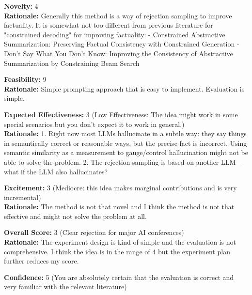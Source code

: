 \begin{tcolorbox}[colback=green!10!white, colframe=green!80!black, title=\textbf{Reviewer 2}]
\small
\textbf{Novelty:} 4\\
\textbf{Rationale:} Generally this method is a way of rejection sampling to improve factuality. It is somewhat not too different from previous literature for "constrained decoding" for improving factuality: 
- Constrained Abstractive Summarization: Preserving Factual Consistency with Constrained Generation
- Don’t Say What You Don’t Know: Improving the Consistency of Abstractive Summarization by Constraining Beam Search

\vspace{10pt}

\textbf{Feasibility:} 9\\
\textbf{Rationale:} Simple prompting approach that is easy to implement. Evaluation is simple.

\vspace{10pt}

\textbf{Expected Effectiveness:} 3 (Low Effectiveness: The idea might work in some special scenarios but you don't expect it to work in general.)\\
\textbf{Rationale:} 1. Right now most LLMs hallucinate in a subtle way: they say things in semantically correct or reasonable ways, but the precise fact is incorrect. Using semantic similarity as a measurement to gauge/control hallucination might not be able to solve the problem. 
2. The rejection sampling is based on another LLM—what if the LLM also hallucinates?

\vspace{10pt}

\textbf{Excitement:} 3 (Mediocre: this idea makes marginal contributions and is very incremental)\\
\textbf{Rationale:} The method is not that novel and I think the method is not that effective and might not solve the problem at all.

\vspace{10pt}

\textbf{Overall Score:} 3 (Clear rejection for major AI conferences)\\
\textbf{Rationale:} The experiment design is kind of simple and the evaluation is not comprehensive. I think the idea is in the range of 4 but the experiment plan further reduces my score.

\vspace{10pt}

\textbf{Confidence:} 5 (You are absolutely certain that the evaluation is correct and very familiar with the relevant literature)
\end{tcolorbox}

